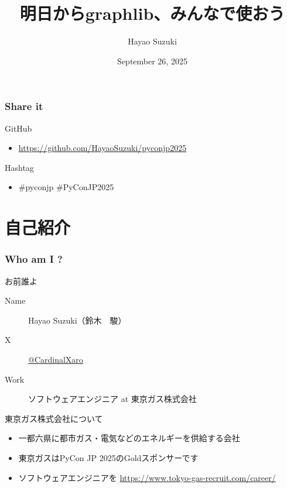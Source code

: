 \documentclass[aspectratio=169,dvipdfmx,12pt,notheorems]{beamer}
\title{明日からgraphlib、みんなで使おう}
\author[Hayao]{Hayao Suzuki}
\institute[PyCon JP 2025]{PyCon JP 2025 at International Conference Center Hiroshima}
\date{September 26, 2025}
\theoremstyle{definition}
\begin{document}
\begin{frame}[plain]\frametitle{}
\titlepage %
\end{frame}

\begin{frame}\frametitle{Share it}

\begin{block}{GitHub}
\begin{itemize}
\item \url{https://github.com/HayaoSuzuki/pyconjp2025}
\end{itemize}
\end{block}

\begin{block}{Hashtag}
\begin{itemize}
\item \#pyconjp \#PyConJP2025
\end{itemize}
\end{block}

\end{frame}

\section{自己紹介}

\begin{frame}\frametitle{Who am I ?}

\begin{block}{お前誰よ}
\begin{description}
\item[Name] Hayao Suzuki（鈴木　駿）
\item[ X] \href{https://twitter.com/CardinalXaro}{@CardinalXaro}
\item[Work] ソフトウェアエンジニア at 東京ガス株式会社
\end{description}
\end{block}

\begin{block}{東京ガス株式会社について}
\begin{itemize}
\item 一都六県に都市ガス・電気などのエネルギーを供給する会社
\item 東京ガスはPyCon JP 2025のGoldスポンサーです
\item ソフトウェアエンジニアを \url{https://www.tokyo-gas-recruit.com/career/}
\end{itemize}
\end{block}

\end{frame}
\end{document}
